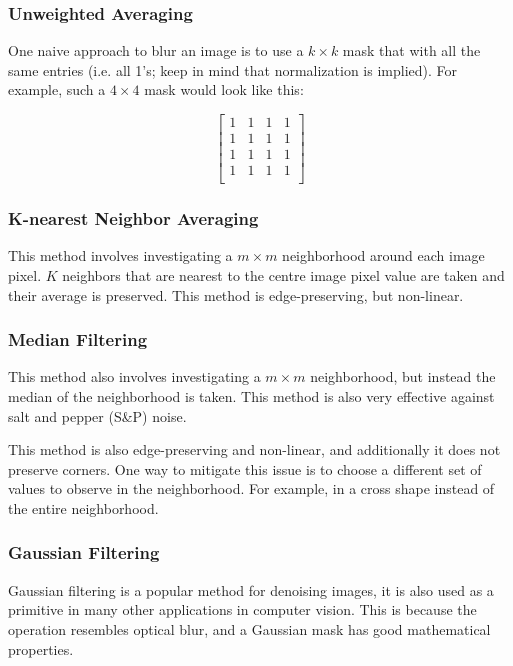 \documentclass{article}
\begin{document}
\begin{multicols}{2}
\subsubsection{Unweighted Averaging}

One naive approach to blur an image is to use a $k \times k$ mask that with all the same entries (i.e. all 1's; keep in mind that normalization is implied). For example, such a $4 \times 4$ mask would look like this:

$$
\left[\begin{matrix} 1&1&1&1\\1&1&1&1\\1&1&1&1\\1&1&1&1\\\end{matrix}\right]
$$

\subsubsection{K-nearest Neighbor Averaging}

This method involves investigating a $m \times m$ neighborhood around each image pixel. $K$ neighbors that are nearest to the centre image pixel value are taken and their average is preserved. This method is edge-preserving, but non-linear.

\subsubsection{Median Filtering}

This method also involves investigating a $m \times m$ neighborhood, but instead the median of the neighborhood is taken. This method is also very effective against salt and pepper (S\&P) noise.

This method is also edge-preserving and non-linear, and additionally it does not preserve corners. One way to mitigate this issue is to choose a different set of values to observe in the neighborhood. For example, in a cross shape instead of the entire neighborhood.

\subsubsection{Gaussian Filtering}

Gaussian filtering is a popular method for denoising images, it is also used as a primitive in many other applications in computer vision. This is because the operation resembles optical blur, and a Gaussian mask has good mathematical properties.


\end{multicols}
\end{document}
